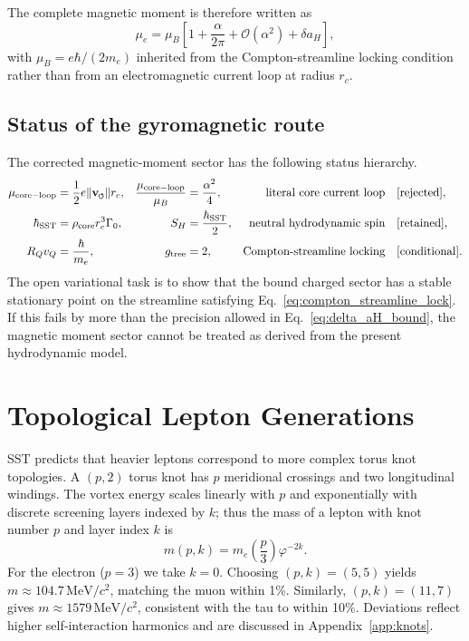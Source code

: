 \documentclass[11pt]{article}
\newcommand{\vnorm}{\lVert \mathbf{v}_{\mkern-2mu\scriptscriptstyle\boldsymbol{\circlearrowleft}} \rVert}  %
\newcommand{\rc}{r_c}                                    %
\newcommand{\rhocore}{\rho_{\text{core}}}
\newcommand{\GammaSST}{\Gamma_0}                         %
\newcommand{\phiG}{\varphi}
\begin{document}
The complete magnetic moment is therefore written as
\begin{equation}
    \mu_e
    = \mu_B\left[1 + \frac{\alpha}{2\pi} + \mathcal{O}(\alpha^2) + \delta a_H\right],
    \label{eq:mu_complete_corrected}
\end{equation}
with $\mu_B=e\hbar/(2m_e)$ inherited from the Compton-streamline locking condition rather than from an electromagnetic current loop at radius $\rc$.

\subsection{Status of the gyromagnetic route}
\label{subsec:g_status}

The corrected magnetic-moment sector has the following status hierarchy.
\begin{align}
    \mu_{\rm core-loop}
    &= \frac{1}{2}e\vnorm\rc,
    &\frac{\mu_{\rm core-loop}}{\mu_B}
    &= \frac{\alpha^2}{4},
    &\text{literal core current loop} &\quad [\mathrm{rejected}],\\
    \hbar_{\rm SST}
    &= \rhocore\rc^3\GammaSST,
    &S_H &= \frac{\hbar_{\rm SST}}{2},
    &\text{neutral hydrodynamic spin} &\quad [\mathrm{retained}],\\
    R_Qv_Q
    &= \frac{\hbar}{m_e},
    &g_{\rm tree} &= 2,
    &\text{Compton-streamline locking} &\quad [\mathrm{conditional}].
\end{align}
The open variational task is to show that the bound charged sector has a stable stationary point on the streamline satisfying Eq.~\eqref{eq:compton_streamline_lock}.  If this fails by more than the precision allowed in Eq.~\eqref{eq:delta_aH_bound}, the magnetic moment sector cannot be treated as derived from the present hydrodynamic model.

\section{Topological Lepton Generations}
\label{sec:leptons}

SST predicts that heavier leptons correspond to more complex torus knot topologies.  A $(p,2)$ torus knot has $p$ meridional crossings and two longitudinal windings.  The vortex energy scales linearly with $p$ and exponentially with discrete screening layers indexed by $k$; thus the mass of a lepton with knot number $p$ and layer index $k$ is
\begin{equation}
    m(p,k) = m_e \left(\frac{p}{3}\right) \phiG^{-2k}.
    \label{eq:lepton_mass}
\end{equation}
For the electron ($p=3$) we take $k=0$.  Choosing $(p,k)=(5,5)$ yields $m \approx 104.7\,\text{MeV}/c^2$, matching the muon within 1\%.  Similarly, $(p,k)=(11,7)$ gives $m \approx 1579\,\text{MeV}/c^2$, consistent with the tau to within 10\%.  Deviations reflect higher self‑interaction harmonics and are discussed in Appendix~\ref{app:knots}.
\end{document}

